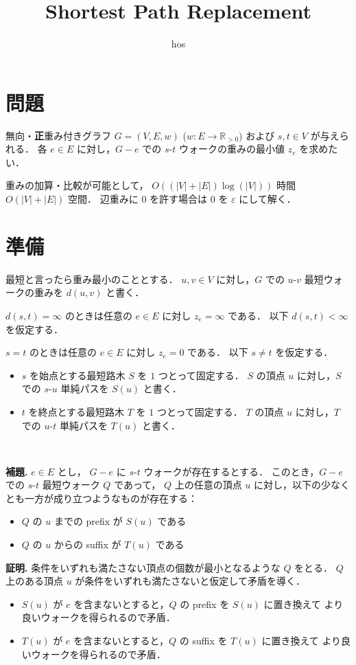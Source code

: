 \documentclass{jsarticle}
\title{Shortest Path Replacement}
\author{hos}
\newcommand{\abs}[1]{\lvert #1 \rvert}
\newcommand{\R}{\mathbb{R}}
\begin{document}
\maketitle


\section{問題}
無向・\textbf{正}重み付きグラフ $G = (V, E, w)$ ($w\colon E \to \R_{>0}$) および
$s, t \in V$ が与えられる．
各 $e \in E$ に対し，$G-e$ での $s$-$t$ ウォークの重みの最小値 $z_e$ を求めたい．

重みの加算・比較が可能として，
$O((\abs{V} + \abs{E}) \log(\abs{V}))$ 時間 $O(\abs{V} + \abs{E})$ 空間．
辺重みに $0$ を許す場合は $0$ を $\varepsilon$ にして解く．


\section{準備}
最短と言ったら重み最小のこととする．
$u, v \in V$ に対し，$G$ での $u$-$v$ 最短ウォークの重みを $d(u, v)$ と書く．

$d(s, t) = \infty$ のときは任意の $e \in E$ に対し $z_e = \infty$ である．
以下 $d(s, t) < \infty$ を仮定する．

$s = t$ のときは任意の $e \in E$ に対し $z_e = 0$ である．
以下 $s \ne t$ を仮定する．

\begin{itemize}
  \item $s$ を始点とする最短路木 $S$ を $1$ つとって固定する．
      $S$ の頂点 $u$ に対し，$S$ での $s$-$u$ 単純パスを $S(u)$ と書く．
  \item $t$ を終点とする最短路木 $T$ を $1$ つとって固定する．
      $T$ の頂点 $u$ に対し，$T$ での $u$-$t$ 単純パスを $T(u)$ と書く．
\end{itemize}

\

\noindent\textbf{補題.}
$e \in E$ とし，
$G-e$ に $s$-$t$ ウォークが存在するとする．
このとき，$G-e$ での $s$-$t$ 最短ウォーク $Q$ であって，
$Q$ 上の任意の頂点 $u$ に対し，以下の少なくとも一方が成り立つようなものが存在する：
\begin{itemize}
  \item $Q$ の $u$ までの prefix が $S(u)$ である
  \item $Q$ の $u$ からの suffix が $T(u)$ である
\end{itemize}

\noindent\textbf{証明.}
条件をいずれも満たさない頂点の個数が最小となるような $Q$ をとる．
$Q$ 上のある頂点 $u$ が条件をいずれも満たさないと仮定して矛盾を導く．
\begin{itemize}
  \item $S(u)$ が $e$ を含まないとすると，$Q$ の prefix を $S(u)$ に置き換えて
      より良いウォークを得られるので矛盾．
  \item $T(u)$ が $e$ を含まないとすると，$Q$ の suffix を $T(u)$ に置き換えて
      より良いウォークを得られるので矛盾．
\end{itemize}
\end{document}
